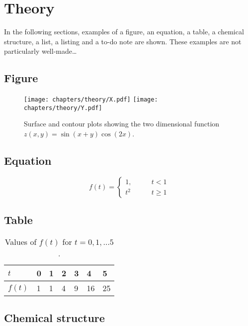\chapter{Theory}

In the following sections, examples of a figure, an equation, a table, a chemical structure, a list, a listing and a to-do note are shown.
These examples are not particularly well-made\dots

\section{Figure}
\begin{figure}[H]
    \centering
    \texttt{[image: chapters/theory/X.pdf]}
    \texttt{[image: chapters/theory/Y.pdf]}
    \caption{Surface and contour plots showing the two dimensional function $z(x,y)=\sin(x+y)\cos(2x)$.}
\end{figure}

\section{Equation}
\begin{equation}
    f(t)=\left\{%
    \begin{array}{ll}
        1,\qquad & t< 1 \\
        t^2 & t\geq 1
    \end{array}\right.
\end{equation}

\section{Table}
\begin{table}[H]
    \centering
    \caption[This (instead of the potentially long caption) appears in the list of tables.]{Values of $f(t)$ for $t=0,1,\dots 5$.}
    \begin{tabular}{lllllll}
        \toprule
        $t$ & 0 & 1 & 2 & 3 & 4 & 5 \\ \midrule
        $f(t)$ & 1 & 1 & 4 & 9 & 16 & 25 \\ \bottomrule
    \end{tabular}
\end{table}

\section{Chemical structure}
\begin{center}
\end{center}

